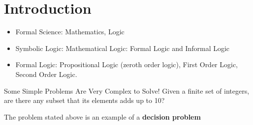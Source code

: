 \section{Introduction}

\begin{itemize}
	\item Formal Science: Mathematics, Logic
	\item Symbolic Logic: Mathematical Logic: Formal Logic and Informal Logic 
	\item Formal Logic: Propositional Logic (zeroth order logic), First Order Logic, Second Order Logic.
	
\end{itemize}



\begin{example}{Some Simple Problems Are Very Complex to Solve!}
	Given a finite set of integers, are there any subset that its elements adds up to 10?
\end{example}


The problem stated above is an example of a \textbf{decision problem}
